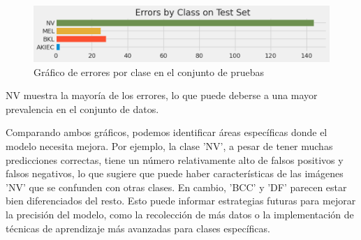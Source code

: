    \begin{figure}[ht]%
      \begin{center}
      \includegraphics[width=1\textwidth]{./Graphics/errorByClass_p3.png}
      \caption{Gráfico de errores por clase en el conjunto de pruebas\label{fig:class_errors_p3}}
      \end{center}
      \end{figure}

NV muestra la mayoría de los errores, lo que puede deberse a una mayor prevalencia en el conjunto de datos.

Comparando ambos gráficos, podemos identificar áreas específicas donde el modelo necesita mejora. Por ejemplo, la clase 'NV', a pesar de tener muchas predicciones correctas, tiene un número relativamente alto de falsos positivos y falsos negativos, lo que sugiere que puede haber características de las imágenes 'NV' que se confunden con otras clases. En cambio, 'BCC' y 'DF' parecen estar bien diferenciados del resto. Esto puede informar estrategias futuras para mejorar la precisión del modelo, como la recolección de más datos o la implementación de técnicas de aprendizaje más avanzadas para clases específicas.